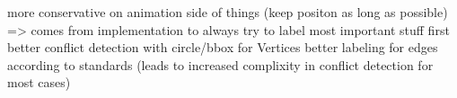 more conservative on animation side of things (keep positon as long as possible) => comes from implementation to always try to label most important stuff first
better conflict detection with circle/bbox for Vertices
better labeling for edges according to standards (leads to increased complixity in conflict detection for most cases)
